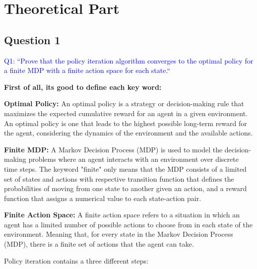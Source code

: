 \documentclass{scrartcl}
\title{\reportname}
\subtitle{Assignment 1 - 2D Grid world}
\author{
    \textbf{Authors:} \\
    \textbf{Martin Nilsson}, \textit{School of Engineering}, Jönköping University
    \and
    \textbf{Besan Ewir}, \textit{School of Engineering}, Jönköping University
    \and
    \textbf{Vladimir Giustacchini}, \textit{School of Engineering}, Jönköping University
    \and
    \textbf{Jorge Cuello}, \textit{School of Engineering}, Jönköping University
}
\date{\today}
\theoremstyle{mytheoremstyle}
\theoremstyle{mytheoremstyle}
\theoremstyle{myproblemstyle}
\begin{document}
\raggedright

\maketitle

\tableofcontents

\newpage

\section{Theoretical Part}

\subsection{Question 1}

\textcolor{blue}{Q1: ``Prove that the policy iteration algorithm converges to the optimal policy for a finite MDP with a finite action space for each state.``}

\textbf{First of all, its good to define each key word:}

\textbf{Optimal Policy:} An optimal policy is a strategy or decision-making rule that maximizes the expected cumulative reward for an agent in a given environment. An optimal policy is one that leads to the highest possible long-term reward for the agent, considering the dynamics of the environment and the available actions.

\textbf{Finite MDP:} A Markov Decision Process (MDP) is used to model the decision-making problems where an agent interacts with an environment over discrete time steps. The keyword "finite" only means that the MDP consists of a limited set of states and actions with respective transition function that defines the probabilities of moving from one state to another given an action, and a reward function that assigns a numerical value to each state-action pair.

\textbf{Finite Action Space:} A finite action space refers to a situation in which an agent has a limited number of possible actions to choose from in each state of the environment. Meaning that, for every state in the Markov Decision Process (MDP), there is a finite set of actions that the agent can take.


Policy iteration contains a three different steps:
\end{document}
